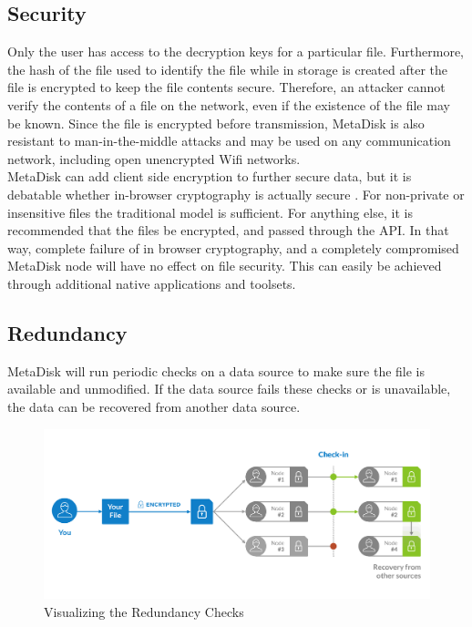 \documentclass[a4paper,10pt]{article}
\begin{document}
\subsection{Security}

Only the user has access to the decryption keys for a particular file. Furthermore, the hash of the file used to identify the file while in storage is created after the file is encrypted to keep the file contents secure. Therefore, an attacker cannot verify the contents of a file on the network, even if the existence of the file may be known. Since the file is encrypted before transmission, MetaDisk is also resistant to man-in-the-middle attacks and may be used on any communication network, including open unencrypted Wifi networks.   \\

MetaDisk can add client side encryption to further secure data, but it is debatable whether in-browser cryptography is actually secure \cite{5}. For non-private or insensitive files the traditional model is sufficient. For anything else, it is recommended that the files be encrypted, and passed through the API. In that way, complete failure of in browser cryptography, and a completely compromised MetaDisk node will have no effect on file security. This can easily be achieved through additional native applications and toolsets.  

\subsection{Redundancy}

MetaDisk will run periodic checks on a data source to make sure the file is available and unmodified. If the data source fails these checks or is unavailable, the data can be recovered from another data source.
 
\begin{figure}[h!]
  \centering
      \includegraphics[width=\linewidth]{03}
  \caption{Visualizing the Redundancy Checks }
\end{figure}
\end{document}
